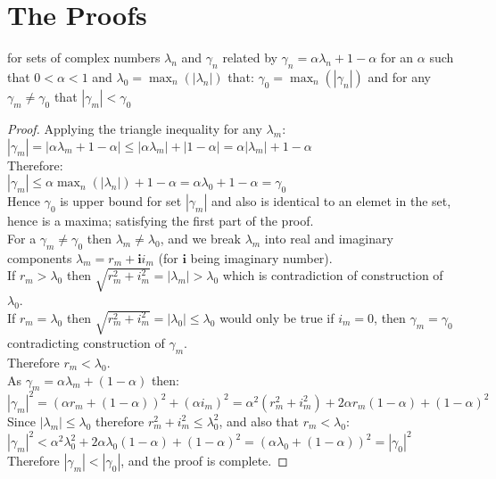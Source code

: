 \section{The Proofs}\label{appendix5b}

\begin{Lemma}\label{lem1}
for sets of complex numbers $\lambda_n$ and $\gamma_n$ related by $\gamma_n=\alpha\lambda_n+1-\alpha$ for an $\alpha$ such that $0<\alpha<1$ and $\lambda_0 = \max_n(|\lambda_n|)$ that: $\gamma_0=\max_n(|\gamma_n|)$ and for any $\gamma_m\ne\gamma_0$ that $|\gamma_m|<\gamma_0$ 
\end{Lemma}
\begin{proof}
Applying the triangle inequality for any $\lambda_m$:\\
$|\gamma_m|=|\alpha\lambda_m+1-\alpha|\le|\alpha\lambda_m|+|1-\alpha|=\alpha|\lambda_m|+1-\alpha$\\
Therefore:\\
$|\gamma_m|\le\alpha\max_n(|\lambda_n|)+1-\alpha=\alpha\lambda_0+1-\alpha=\gamma_0$\\
Hence $\gamma_0$ is upper bound for set $|\gamma_m|$ and also is identical to an elemet in the set, hence is a maxima; satisfying the first part of the proof.\\
For a $\gamma_m\ne\gamma_0$ then $\lambda_m\ne\lambda_0$, and we break $\lambda_m$ into real and imaginary components $\lambda_m=r_m+\mathbf{i}i_m$ (for $\mathbf{i}$ being imaginary number).\\
If $r_m>\lambda_0$ then $\sqrt{r^2_m+i^2_m}=|\lambda_m|>\lambda_0$ which is contradiction of construction of $\lambda_0$.\\
If $r_m=\lambda_0$ then $\sqrt{r^2_m+i^2_m}=|\lambda_0|\le\lambda_0$ would only be true if $i_m=0$, then $\gamma_m=\gamma_0$ contradicting construction of $\gamma_m$.\\
Therefore $r_m<\lambda_0$.\\
As $\gamma_m=\alpha\lambda_m+(1-\alpha)$ then:\\
$|\gamma_m|^2=(\alpha r_m+(1-\alpha))^2+(\alpha i_m)^2=\alpha^2(r_m^2+i_m^2)+2\alpha r_m(1-\alpha) + (1-\alpha)^2$\\
Since $|\lambda_m|\le\lambda_0$ therefore $r_m^2+i_m^2\le\lambda_0^2$, and also that $r_m<\lambda_0$:\\
$|\gamma_m|^2<\alpha^2\lambda_0^2+2\alpha \lambda_0(1-\alpha) + (1-\alpha)^2 = (\alpha\lambda_0 + (1-\alpha))^2=|\gamma_0|^2$\\
Therefore $|\gamma_m| < |\gamma_0|$, and the proof is complete.
\end{proof}



